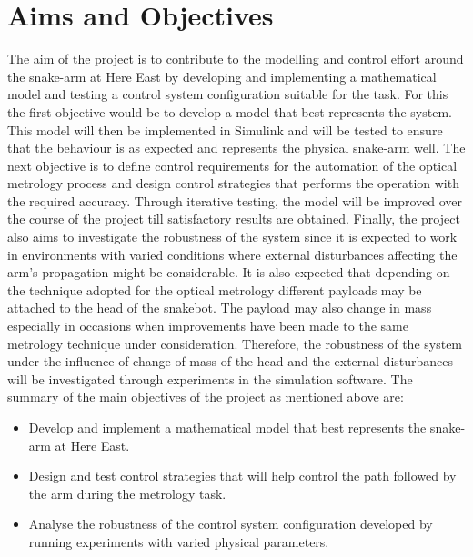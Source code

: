 \documentclass[a4paper,12pt]{report}
\begin{document}
\section{Aims and Objectives}
The aim of the project is to contribute to the modelling and control effort around the snake-arm at Here East by developing and implementing a mathematical model and testing a control system configuration suitable for the task.
For this the first objective would be to develop a model that best represents the system. This model will then be implemented in Simulink and will be tested to ensure that the behaviour is as expected and represents the physical snake-arm well. 
The next objective is to define control requirements for the automation of the optical metrology process and design control strategies that performs the operation with the required accuracy. Through iterative testing, the model will be improved over the course of the project till satisfactory results are obtained.
Finally, the project also aims to investigate the robustness of the system since it is expected to work in environments with varied conditions where external disturbances affecting the arm’s propagation might be considerable. It is also expected that depending on the technique adopted for the optical metrology different payloads may be attached to the head of the snakebot. The payload may also change in mass especially in occasions when improvements have been made to the same metrology technique under consideration. Therefore, the robustness of the system under the influence of change of mass of the head and the external disturbances will be investigated through experiments in the simulation software.
The summary of the main objectives of the project as mentioned above are:
\begin{itemize}
	\item Develop and implement a mathematical model that best represents the snake-arm at Here East.
	\item Design and test control strategies that will help control the path followed by the arm during the metrology task.
	\item Analyse the robustness of the control system configuration developed by running experiments with varied physical parameters.
\end{itemize}
 
\end{document}
